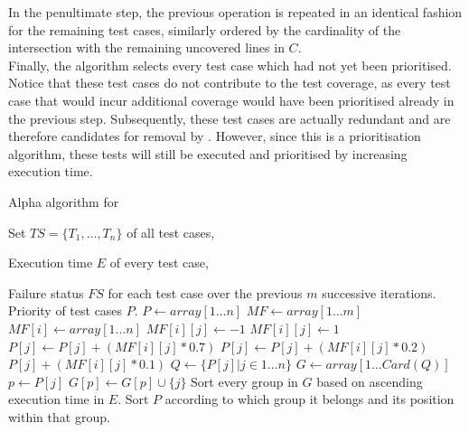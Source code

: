 \noindent In the penultimate step, the previous operation is repeated in an identical fashion for the remaining test cases, similarly ordered by the cardinality of the intersection with the remaining uncovered lines in $C$.\\

\noindent Finally, the algorithm selects every test case which had not yet been prioritised. Notice that these test cases do not contribute to the test coverage, as every test case that would incur additional coverage would have been prioritised already in the previous step. Subsequently, these test cases are actually redundant and are therefore candidates for removal by \tsm{}. However, since this is a prioritisation algorithm, these tests will still be executed and prioritised by increasing execution time.

\begin{algorithm}[h!]
\caption{Alpha algorithm for \tcp{}}
\label{alg:alpha}
\begin{algorithmic}[1]
	 Set $TS = \{T_1, \dots, T_n\}$ of all test cases,
	
	Execution time $E$ of every test case,
	
	Failure status $FS$ for each test case over the previous $m$ successive iterations.
	 Priority of test cases $P$.
	\State $P \gets array[1 \dots n]$ 
	\State $MF \gets array[1 \dots m]$
	\State $MF[i] \gets array[1 \dots n]$
	 $MF[i][j] \gets -1$
	\Else{} $MF[i][j] \gets 1$
	\EndIf
	\EndFor
	\EndFor
	 $P[j] \gets P[j] + (MF[i][j] * 0.7)$
	 $P[j] \gets P[j] + (MF[i][j] * 0.2)$
	\Else{} $P[j] + (MF[i][j] * 0.1)$
	\EndIf
	\EndFor
	\EndFor
	\State $Q \gets \{P[j] \vert j \in 1 \dots n\}$ 
	\State $G \gets array[1 \dots Card(Q)]$ 
	\State $p \gets P[j]$
	\State $G[p] \gets G[p] \cup \{j\}$
	\EndFor
	\State Sort every group in $G$ based on ascending execution time in $E$.
	\State Sort $P$ according to which group it belongs and its position within that group.
\end{algorithmic}
\end{algorithm}